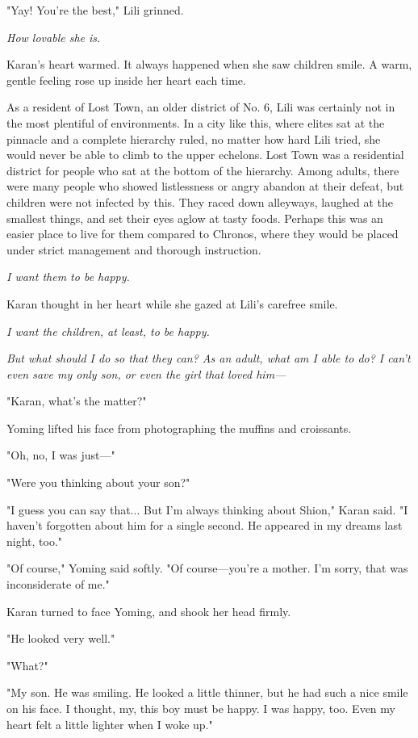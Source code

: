 "Yay! You're the best," Lili grinned.

\emph{How lovable she is.}

Karan's heart warmed. It always happened when she saw children smile. A
warm, gentle feeling rose up inside her heart each time.

As a resident of Lost Town, an older district of No. 6, Lili was
certainly not in the most plentiful of environments. In a city like
this, where elites sat at the pinnacle and a complete hierarchy ruled,
no matter how hard Lili tried, she would never be able to climb to the
upper echelons. Lost Town was a residential district for people who sat
at the bottom of the hierarchy. Among adults, there were many people who
showed listlessness or angry abandon at their defeat, but children were
not infected by this. They raced down alleyways, laughed at the smallest
things, and set their eyes aglow at tasty foods. Perhaps this was an
easier place to live for them compared to Chronos, where they would be
placed under strict management and thorough instruction.

\emph{I want them to be happy.}

Karan thought in her heart while she gazed at Lili's carefree smile.

\emph{I want the children, at least, to be happy.}

\emph{But what should I do so that they can? As an adult, what am I able to
do? I can't even save my only son, or even the girl that loved him---}

"Karan, what's the matter?"

Yoming lifted his face from photographing the muffins and croissants.

"Oh, no, I was just---"

"Were you thinking about your son?"

"I guess you can say that... But I'm always thinking about Shion," Karan
said. "I haven't forgotten about him for a single second. He appeared in
my dreams last night, too."

"Of course," Yoming said softly. "Of course---you're a mother. I'm sorry,
that was inconsiderate of me."

Karan turned to face Yoming, and shook her head firmly.

"He looked very well."

"What?"

"My son. He was smiling. He looked a little thinner, but he had such a
nice smile on his face. I thought, my, this boy must be happy. I was
happy, too. Even my heart felt a little lighter when I woke up."

